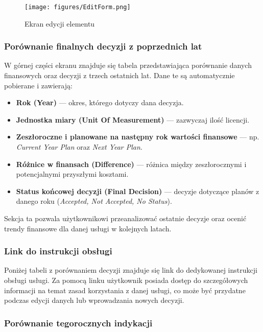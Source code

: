 \begin{figure}[h]
\centering
\texttt{[image: figures/EditForm.png]}
\caption{Ekran edycji elementu}
\label{fig:EditForm }
\end{figure}

\subsubsection{Porównanie finalnych decyzji z poprzednich lat}

W górnej części ekranu znajduje się tabela przedstawiająca porównanie danych finansowych oraz decyzji z trzech ostatnich lat. Dane te są automatycznie pobierane i zawierają:

\begin{itemize}
\item \textbf{Rok (Year)} — okres, którego dotyczy dana decyzja.
\item \textbf{Jednostka miary (Unit Of Measurement)} — zazwyczaj ilość licencji.
\item \textbf{Zeszłoroczne i planowane na następny rok wartości finansowe} — np. \textit{Current Year Plan} oraz \textit{Next Year Plan}.
\item \textbf{Różnice w finansach (Difference)} — różnica między zeszłorocznymi i potencjalnymi przyszłymi kosztami.
\item \textbf{Status końcowej decyzji (Final Decision)} — decyzje dotyczące planów z danego roku (\textit{Accepted, Not Accepted, No Status}).
\end{itemize}

Sekcja ta pozwala użytkownikowi przeanalizować ostatnie decyzje oraz ocenić trendy finansowe dla danej usługi w kolejnych latach.

\subsubsection{Link do instrukcji obsługi}

Poniżej tabeli z porównaniem decyzji znajduje się link do dedykowanej instrukcji obsługi usługi. Za pomocą linku użytkownik posiada dostęp do szczegółowych informacji na temat zasad korzystania z danej usługi, co może być przydatne podczas edycji danych lub wprowadzania nowych decyzji.

\subsubsection{Porównanie tegorocznych indykacji}

